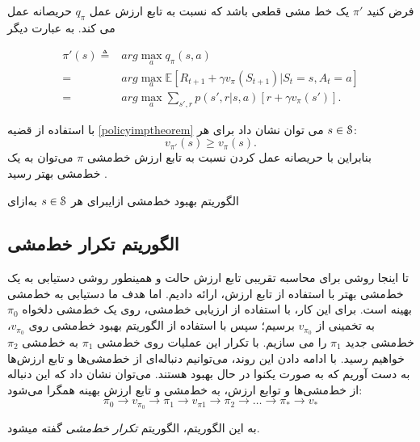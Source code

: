 فرض کنید $\pi'$ یک خط مشی قطعی باشد که نسبت به تابع ارزش عمل 
$q_\pi$
حریصانه عمل می کند. به عبارت دیگر

\begin{align*}
	\pi'(s) \triangleq& arg\max_{a} q_\pi(s,a) \\
	= & arg\max_{a} \mathbb{E}\left[R_{t+1} + \gamma v_\pi(S_{t+1}) | S_t = s, A_t = a\right] \\
	= & arg \max_{a} \sum_{s',r} p(s',r|s,a) \left[r + \gamma v_\pi(s')\right].\end{align*}

با استفاده از قضیه \ref{policyimptheorem} می توان نشان داد برای هر
$s \in \EuScript{S}$:
$$v_{\pi'}(s) \ge v_{\pi}(s).$$
بنابراین با حریصانه عمل کردن نسبت به تابع ارزش خط‌مشی $\pi$ می‌توان به یک خط‌مشی بهتر رسید \cite{suttonbook}.


{الگوریتم بهبود خط‌مشی}
‌ازای{برای هر $s \in \EuScript{S}$}
‌به‌ازای

\subsection{الگوریتم تکرار خط‌مشی}
تا اینجا روشی برای محاسبه تقریبی تابع ارزش حالت و همینطور روشی دستیابی به یک خط‌مشی بهتر با استفاده از تابع ارزش، ارائه دادیم. اما هدف ما دستیابی به خط‌مشی بهینه است. 
برای این کار، با استفاده از ارزیابی خط‌مشی، روی یک خط‌مشی دلخواه $\pi_0$ به تخمینی از 
$v_{\pi_0}$
 برسیم؛ سپس با استفاده از الگوریتم بهبود خط‌مشی روی 
$v_{\pi_0}$،
خط‌مشی جدید 
$\pi_1$
را می سازیم. با تکرار این عملیات روی خط‌مشی 
$\pi_1$
به خط‌مشی 
$\pi_2$
خواهیم رسید. با ادامه دادن این روند، می‌توانیم دنباله‌ای از خط‌مشی‌ها و تابع ارزش‌ها به دست آوریم که به صورت یکنوا در حال بهبود هستند. می‌توان نشان داد که این دنباله از خط‌مشی‌ها و توابع ارزش، به خط‌مشی و تابع ارزش بهینه همگرا می‌شود:
$$\pi_0 \longrightarrow v_{\pi_0} \longrightarrow \pi_1 \longrightarrow v_{\pi{1}} \longrightarrow \pi_2 \longrightarrow \dots \longrightarrow \pi_* \longrightarrow v_*$$

به این الگوریتم، الگوریتم \textit{تکرار خط‌مشی}  
گفته می\nf شود.

